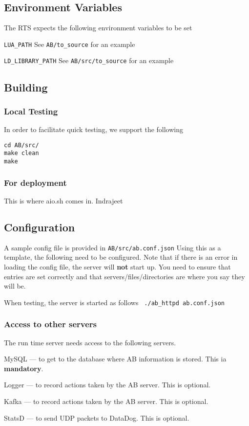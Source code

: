 \documentclass[letterpaper]{article}
\begin{document}
\subsection{Environment Variables}

The RTS expects the following environment variables to be set
\be
\item \verb+LUA_PATH+ 
  See \verb+AB/to_source+ for an example
\item \verb+LD_LIBRARY_PATH+
  See \verb+AB/src/to_source+ for an example
  \ee

\subsection{Building}

\subsubsection{Local Testing}
In order to facilitate quick testing, we support the following
\begin{verbatim}
cd AB/src/
make clean
make
\end{verbatim}

\subsubsection{For deployment}

This is where aio.sh comes in. Indrajeet \TBC

\subsection{Configuration}
A sample config file is provided in 
\verb+AB/src/ab.conf.json+ Using this as a template, the following need to be
configured. Note that if there is an error in loading the config file, the
server will {\bf not} start up. You need to ensure that entries are set
correctly and that servers/files/directories are where you say they will be.

When testing, the server is started as follows \verb+ ./ab_httpd ab.conf.json+

\subsubsection{Access to other servers}

The run time server needs access to the following servers. 
\be
\item MySQL --- to get to the database where AB information is stored. This ia
  {\bf mandatory}.
\item Logger --- to record actions taken by the AB server. This is optional.
\item Kafka --- to record actions taken by the AB server. This is optional.
\item StatsD --- to send UDP packets to DataDog. This is optional.
\ee
\end{document}
